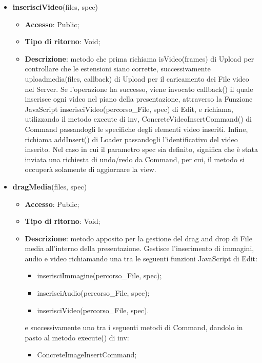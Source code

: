 {{\begin{itemize}
\begin{itemize}
			\end{itemize}
			\item \textbf{inserisciVideo}(files, spec)
			\begin{itemize}
				\item \textbf{Accesso}: Public;
				\item \textbf{Tipo di ritorno}: Void;
				\item \textbf{Descrizione}: metodo che prima richiama isVideo(frames) di Upload per controllare che le estensioni siano corrette, successivamente uploadmedia(files, callback) di Upload per il caricamento dei File video nel Server. Se l'operazione ha successo, viene invocato callback() il quale inserisce ogni video nel piano della presentazione, attraverso la Funzione\ped{g} JavaScript inserisciVideo(percorso\_File, spec) di Edit, e richiama, utilizzando il metodo execute di inv, ConcreteVideoInsertCommand() di Command passandogli le specifiche degli elementi video inseriti. Infine, richiama addInsert() di Loader passandogli l'identificativo del video inserito. Nel caso in cui il parametro spec sia definito, significa che è stata inviata una richiesta di undo/redo da Command, per cui, il metodo si occuperà solamente di aggiornare la view.
			\end{itemize}
			\item \textbf{dragMedia}(files, spec)
			\begin{itemize}
				\item \textbf{Accesso}: Public;
				\item \textbf{Tipo di ritorno}: Void;
				\item \textbf{Descrizione}: metodo apposito per la gestione del drag and drop di File media all'interno della presentazione. Gestisce l'inserimento di immagini, audio e video richiamando una tra le seguenti funzioni\ped{g} JavaScript di Edit:
				\begin{itemize}
					\item inserisciImmagine(percorso\_File, spec);
					\item inserisciAudio(percorso\_File, spec);
					\item inserisciVideo(percorso\_File, spec).
				\end{itemize}
				 e successivamente uno tra i seguenti metodi di Command, dandolo in pasto al metodo execute() di inv:
				\begin{itemize}
					\item ConcreteImageInsertCommand;

\end{itemize}
\end{itemize}
\end{itemize}}}
